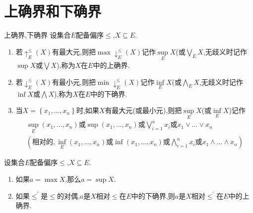 \section{上确界和下确界}

\begin{definition}{上确界,下确界}{}
	设集合$E$配备偏序$\leq$,$X\subseteq E$.
	\begin{enumerate}
		\item 若$\uparrow_{E}^{\leq}\left(X\right)$有最大元,则把$\max\downarrow_{E}^{\leq}\left(X\right)$记作$\sup\limits_{E}X$(或$\bigvee\limits_{E}X$,无歧义时记作$\sup X$或$\bigvee X$),称为$X$在$E$中的上确界.
		\item 若$\downarrow_{E}^{\leq}\left(X\right)$有最小元,则把$\min\downarrow_{E}^{\leq}\left(X\right)$记作$\inf\limits_{E}X$(或$\bigwedge\limits_{E}X$,无歧义时记作$\inf X$或$\bigwedge X$),称为$X$在$E$中的下确界.
		\item 当$X=\left\{x_{1},\ldots,x_{n}\right\}$时,如果$X$有最大元(或最小元),则把$\sup\limits_{E}X$(或$\inf\limits_{E}X$)记作
		\begin{gather*}
			\sup_{E}\left(x_{1},\ldots,x_{n}\right)\text{或}\sup\left(x_{1},\ldots,x_{n}\right)\text{或}\bigvee\limits_{i=1}^{n}x_{i}\text{或}x_{1}\vee\ldots\vee x_{n}\\
			(\text{相对的},\inf_{E}\left(x_{1},\ldots,x_{n}\right)\text{或}\inf\left(x_{1},\ldots,x_{n}\right)\text{或}\bigwedge\limits_{i=1}^{n}x_{i}\text{或}x_{1}\wedge\ldots\wedge x_{n})
		\end{gather*}
	\end{enumerate}
\end{definition}

\begin{proposition}{}{}
	设集合$E$配备偏序$\leq$,$X\subseteq E$.
	\begin{enumerate}
		\item 如果$a=\max X$,那么$a=\sup X$.
		\item 如果$\leq^{\prime}$是$\leq$的对偶,$a$是$X$相对$\leq$在$E$中的下确界,则$a$是$X$相对$\leq^{\prime}$在$E$中的上确界.
	\end{enumerate}
\end{proposition}

